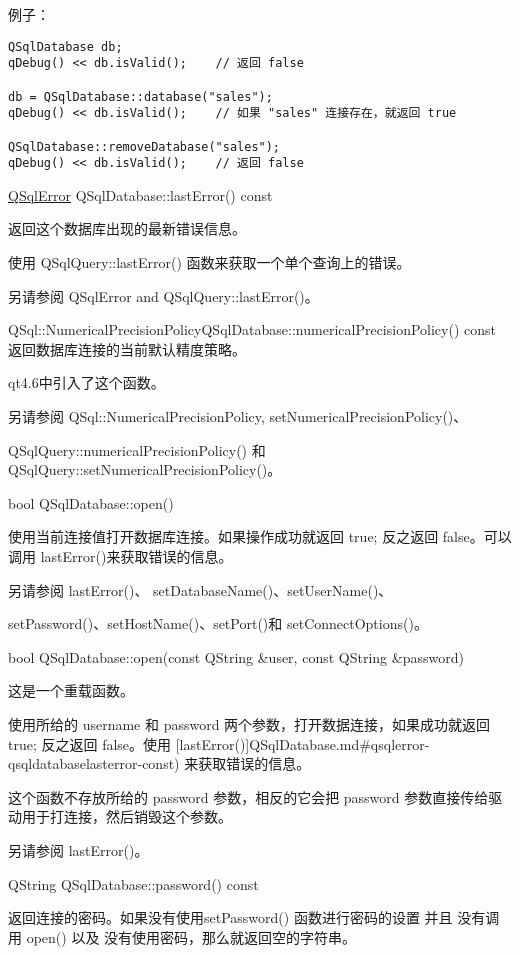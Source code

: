 例子：

\begin{lstlisting}
QSqlDatabase db;
qDebug() << db.isValid();    // 返回 false

db = QSqlDatabase::database("sales");
qDebug() << db.isValid();    // 如果 "sales" 连接存在，就返回 true

QSqlDatabase::removeDatabase("sales");
qDebug() << db.isValid();    // 返回 false
\end{lstlisting}

\href{https://doc.qt.io/qt-5/qsqlerror.html}{QSqlError} QSqlDatabase::lastError() const

返回这个数据库出现的最新错误信息。

使用 QSqlQuery::lastError() 函数来获取一个单个查询上的错误。

另请参阅 QSqlError and QSqlQuery::lastError()。

QSql::NumericalPrecisionPolicyQSqlDatabase::numericalPrecisionPolicy() const
返回数据库连接的当前默认精度策略。

qt4.6中引入了这个函数。

另请参阅 QSql::NumericalPrecisionPolicy, setNumericalPrecisionPolicy()、

QSqlQuery::numericalPrecisionPolicy() 和 QSqlQuery::setNumericalPrecisionPolicy()。

bool QSqlDatabase::open()


使用当前连接值打开数据库连接。如果操作成功就返回 true; 反之返回 false。可以调用 lastError()来获取错误的信息。

另请参阅 lastError()、 setDatabaseName()、setUserName()、

setPassword()、setHostName()、setPort()和 setConnectOptions()。

bool QSqlDatabase::open(const QString \&user, const QString \&password)


这是一个重载函数。

使用所给的 username 和 password 两个参数，打开数据连接，如果成功就返回 true; 反之返回 false。使用 [lastError()]QSqlDatabase.md\#qsqlerror-qsqldatabaselasterror-const) 来获取错误的信息。

这个函数不存放所给的 password 参数，相反的它会把 password 参数直接传给驱动用于打连接，然后销毁这个参数。

另请参阅 lastError()。

QString QSqlDatabase::password() const


返回连接的密码。如果没有使用setPassword() 函数进行密码的设置 并且 没有调用 open() 以及 没有使用密码，那么就返回空的字符串。

